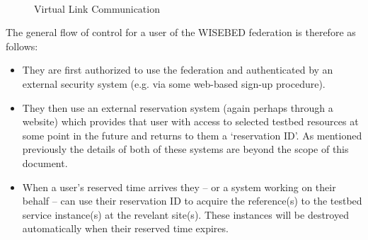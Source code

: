 \begin{figure}[htbp]
	\begin{center}
		\mbox
		{
			\quad
		}
		\caption{Virtual Link Communication}
		\label{fig:architecture-vlinks}
	\end{center}
\end{figure}	

The general flow of control for a user of the WISEBED federation is therefore as follows: 
\begin{itemize}
	
	\item They are first authorized to use the federation and authenticated by an external security system (e.g. via some web-based sign-up procedure). 
	
	\item They then use an external reservation system (again perhaps through a website) which provides that user with access to selected testbed resources at some point in the future and returns to them a `reservation ID'. As mentioned previously the details of both of these systems are beyond the scope of this document. 
	
	\item When a user's reserved time arrives they -- or a system working on their behalf -- can use their reservation ID to acquire the reference(s) to the testbed service instance(s) at the revelant site(s). These instances will be destroyed automatically when their reserved time expires. 

\end{itemize}

